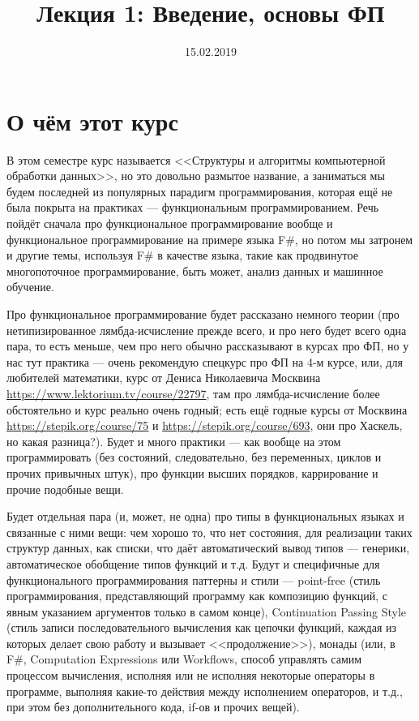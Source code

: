 \documentclass[a5paper]{article}
\title{Лекция 1: Введение, основы ФП}
\date{15.02.2019}
\begin{document}
\maketitle
\thispagestyle{empty}

\section{О чём этот курс}
В этом семестре курс называется <<Структуры и алгоритмы компьютерной обработки данных>>, но это довольно размытое название, а заниматься мы будем последней из популярных парадигм программирования, которая ещё не была покрыта на практиках --- функциональным программированием. Речь пойдёт сначала про функциональное программирование вообще и функциональное программирование на примере языка F\#, но потом мы затронем и другие темы, используя F\# в качестве языка, такие как продвинутое многопоточное программирование, быть может, анализ данных и машинное обучение.

Про функциональное программирование будет рассказано немного теории (про нетипизированное лямбда-исчисление прежде всего, и про него будет всего одна пара, то есть меньше, чем про него обычно рассказывают в курсах про ФП, но у нас тут практика --- очень рекомендую спецкурс про ФП на 4-м курсе, или, для любителей математики, курс от Дениса Николаевича Москвина \url{https://www.lektorium.tv/course/22797}, там про лямбда-исчисление более обстоятельно и курс реально очень годный; есть ещё годные курсы от Москвина \url{https://stepik.org/course/75} и \url{https://stepik.org/course/693}, они про Хаскель, но какая разница?). Будет и много практики --- как вообще на этом программировать (без состояний, следовательно, без переменных, циклов и прочих привычных штук), про функции высших порядков, каррирование и прочие подобные вещи.

Будет отдельная пара (и, может, не одна) про типы в функциональных языках и связанные с ними вещи: чем хорошо то, что нет состояния, для реализации таких структур данных, как списки, что даёт автоматический вывод типов --- генерики, автоматическое обобщение типов функций и т.д. Будут и специфичные для функционального программирования паттерны и стили --- point-free (стиль программирования, представляющий программу как композицию функций, с явным указанием аргументов только в самом конце), Continuation Passing Style (стиль записи последовательного вычисления как цепочки функций, каждая из которых делает свою работу и вызывает <<продолжение>>), монады (или, в F\#, Computation Expressions или Workflows, способ управлять самим процессом вычисления, исполняя или не исполняя некоторые операторы в программе, выполняя какие-то действия между исполнением операторов, и т.д., при этом без дополнительного кода, if-ов и прочих вещей).
\end{document}

